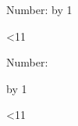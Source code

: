 \newcount\counter
{}

\def\while#1#2{
	\loop
	#2
	\ifnum #1
	\repeat
}

\def\for#1#2#3{
	\counter=#1
	\while{\counter<#2}{
		#3
		\advance \counter by 1
	}
}

\while{\counter<11}{
	Number: \the\counter
	\advance\counter by 1
}

\for{1}{11}{
	Number: \the\counter
}

\bye
